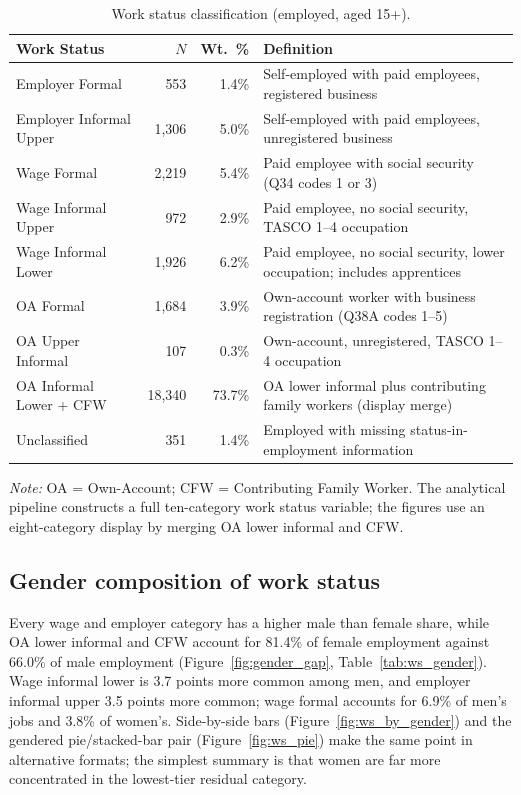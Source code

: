 \documentclass[12pt,a4paper]{article}
\begin{document}
\begin{table}[H]
\centering
\caption{Work status classification (employed, aged 15+).}
\label{tab:work_status}
\small
\begin{tabularx}{\textwidth}{lrrX}
\toprule
Work Status & $N$ & Wt.\ \% & Definition \\
\midrule
Employer Formal        &   553  &  1.4\% & Self-employed with paid employees, registered business \\
Employer Informal Upper& 1,306  &  5.0\% & Self-employed with paid employees, unregistered business \\
Wage Formal            & 2,219  &  5.4\% & Paid employee with social security (Q34 codes 1 or 3) \\
Wage Informal Upper    &   972  &  2.9\% & Paid employee, no social security, TASCO 1--4 occupation \\
Wage Informal Lower    & 1,926  &  6.2\% & Paid employee, no social security, lower occupation; includes apprentices \\
OA Formal              & 1,684  &  3.9\% & Own-account worker with business registration (Q38A codes 1--5) \\
OA Upper Informal      &   107  &  0.3\% & Own-account, unregistered, TASCO 1--4 occupation \\
OA Informal Lower + CFW&18,340  & 73.7\% & OA lower informal plus contributing family workers (display merge) \\
Unclassified           &   351  &  1.4\% & Employed with missing status-in-employment information \\
\bottomrule
\end{tabularx}

\smallskip
\footnotesize\textit{Note:} OA = Own-Account; CFW = Contributing Family Worker. The analytical pipeline constructs a full ten-category work status variable; the figures use an eight-category display by merging OA lower informal and CFW.
\end{table}

\subsection{Gender composition of work status}

Every wage and employer category has a higher male than female share, while OA lower informal and CFW account for 81.4\% of female employment against 66.0\% of male employment (Figure~\ref{fig:gender_gap}, Table~\ref{tab:ws_gender}). Wage informal lower is 3.7 points more common among men, and employer informal upper 3.5 points more common; wage formal accounts for 6.9\% of men's jobs and 3.8\% of women's. Side-by-side bars (Figure~\ref{fig:ws_by_gender}) and the gendered pie/stacked-bar pair (Figure~\ref{fig:ws_pie}) make the same point in alternative formats; the simplest summary is that women are far more concentrated in the lowest-tier residual category.
\end{document}

